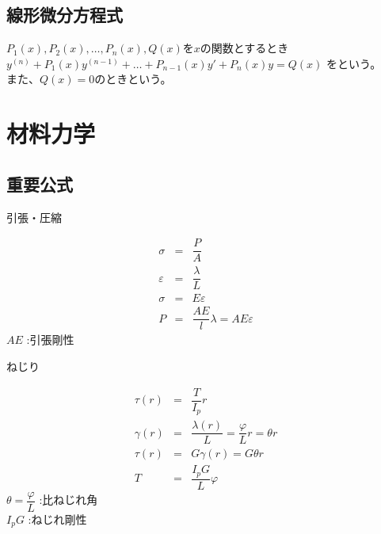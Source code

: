 \documentclass[a4paper]{jsarticle}
\begin{document}
\subsection{線形微分方程式}
$P_1\left(x\right),P_2\left(x\right),\dots,P_n\left(x\right),Q\left(x\right)$を$x$の関数とするとき\\
$y^{\left(n\right)}+P_1\left(x\right)y^{\left(n-1\right)}+\dots+P_{n-1}\left(x\right)y'+P_n\left(x\right)y=Q\left(x\right)$
をという。\\
また、$Q\left(x\right)=0$のときという。
\newpage
\section{材料力学}
\subsection{重要公式}
\begin{itembox}[l]{引張・圧縮}
    \begin{center}
        \begin{eqnarray*}
            \sigma&=&\dfrac{P}{A}\\
            \varepsilon&=&\dfrac{\lambda}{L}\\
            \sigma&=&E\varepsilon\\
            P&=&\dfrac{AE}{l}\lambda=AE\varepsilon
        \end{eqnarray*}
        $AE$  :引張剛性
    \end{center}
\end{itembox}
\begin{itembox}[l]{ねじり}
    \begin{center}
        \begin{eqnarray*}
            \tau\left(r\right)&=&\dfrac{T}{I_p} r\\
            \gamma\left(r\right)&=&\dfrac{\lambda\left(r\right)}{L}=\dfrac{\varphi}{L}r=\theta r\\
            \tau\left(r\right)&=&G\gamma\left(r\right)=G\theta r\\
            T&=&\dfrac{I_pG}{L}\varphi
        \end{eqnarray*}
        $\theta=\dfrac{\varphi}{L}$ :比ねじれ角\\
        $I_pG$  :ねじれ剛性
    \end{center}
\end{itembox}
\end{document}
